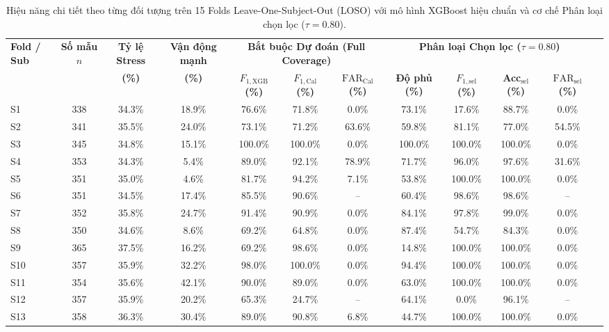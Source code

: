 \begin{table}[t]
\caption{Hiệu năng chi tiết theo từng đối tượng trên 15 Folds Leave-One-Subject-Out (LOSO) với mô hình XGBoost hiệu chuẩn và cơ chế Phân loại chọn lọc ($\tau = 0.80$).}
\label{tab:per_subject_loso}
\centering
\small
\begin{tabular}{lcccc|ccc|cccc}
\toprule
\multirow{2}{*}{\textbf{Fold / Sub}} & \multirow{2}{*}{\textbf{Số mẫu $n$}} & \textbf{Tỷ lệ Stress} & \textbf{Vận động mạnh} & \multicolumn{3}{c|}{\textbf{Bắt buộc Dự đoán (Full Coverage)}} & \multicolumn{4}{c}{\textbf{Phân loại Chọn lọc ($\tau = 0.80$)}} \\
& & \textbf{(\%)} & \textbf{(\%)} & \textbf{$F_{1,\text{XGB}}$ (\%)} & \textbf{$F_{1,\text{Cal}}$ (\%)} & \textbf{$\text{FAR}_{\text{Cal}}$ (\%)} & \textbf{Độ phủ (\%)} & \textbf{$F_{1,\text{sel}}$ (\%)} & \textbf{Acc$_{\text{sel}}$ (\%)} & \textbf{$\text{FAR}_{\text{sel}}$ (\%)} \\
\midrule
S1 & 338 & 34.3\% & 18.9\% & 76.6\% & 71.8\% & 0.0\% & 73.1\% & 17.6\% & 88.7\% & 0.0\% \\
S2 & 341 & 35.5\% & 24.0\% & 73.1\% & 71.2\% & 63.6\% & 59.8\% & 81.1\% & 77.0\% & 54.5\% \\
S3 & 345 & 34.8\% & 15.1\% & 100.0\% & 100.0\% & 0.0\% & 100.0\% & 100.0\% & 100.0\% & 0.0\% \\
S4 & 353 & 34.3\% & 5.4\% & 89.0\% & 92.1\% & 78.9\% & 71.7\% & 96.0\% & 97.6\% & 31.6\% \\
S5 & 351 & 35.0\% & 4.6\% & 81.7\% & 94.2\% & 7.1\% & 53.8\% & 100.0\% & 100.0\% & 0.0\% \\
S6 & 351 & 34.5\% & 17.4\% & 85.5\% & 90.6\% & -- & 60.4\% & 98.6\% & 98.6\% & -- \\
S7 & 352 & 35.8\% & 24.7\% & 91.4\% & 90.9\% & 0.0\% & 84.1\% & 97.8\% & 99.0\% & 0.0\% \\
S8 & 350 & 34.6\% & 8.6\% & 69.2\% & 64.8\% & 0.0\% & 87.4\% & 54.7\% & 84.3\% & 0.0\% \\
S9 & 365 & 37.5\% & 16.2\% & 69.2\% & 98.6\% & 0.0\% & 14.8\% & 100.0\% & 100.0\% & 0.0\% \\
S10 & 357 & 35.9\% & 32.2\% & 98.0\% & 100.0\% & 0.0\% & 94.4\% & 100.0\% & 100.0\% & 0.0\% \\
S11 & 354 & 35.6\% & 42.1\% & 90.0\% & 89.0\% & 0.0\% & 63.0\% & 100.0\% & 100.0\% & 0.0\% \\
S12 & 357 & 35.9\% & 20.2\% & 65.3\% & 24.7\% & -- & 64.1\% & 0.0\% & 96.1\% & -- \\
S13 & 358 & 36.3\% & 30.4\% & 89.0\% & 90.8\% & 6.8\% & 44.7\% & 100.0\% & 100.0\% & 0.0\% \\

\end{tabular}
\end{table}
